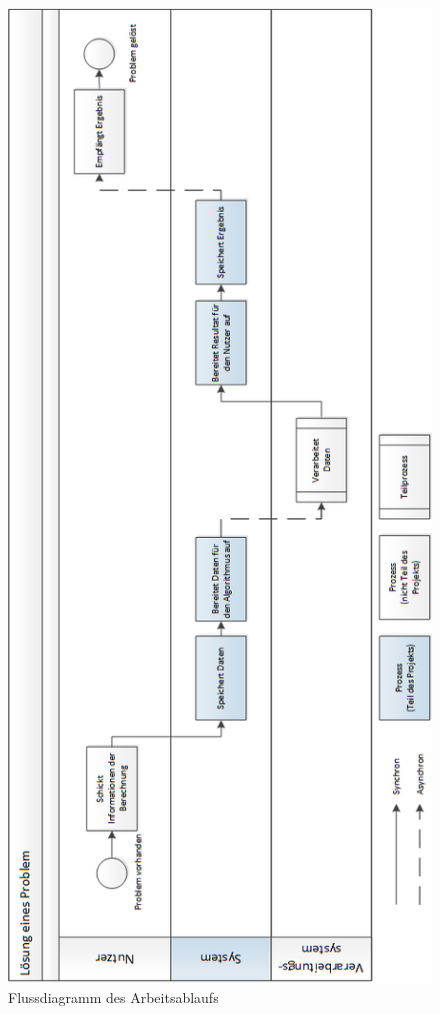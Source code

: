 \begin{figure}[h]
\centering
\includegraphics[scale=0.605]{images/visio/workflow.png}
\caption[Flussdiagramm des Arbeitsablaufs]{Flussdiagramm des Arbeitsablaufs \selfmade{}}
\label{fig:workflow}
\end{figure}

